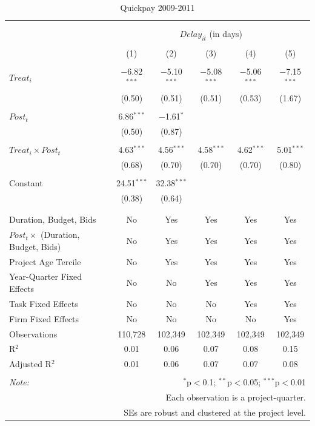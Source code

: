\documentclass[
]{article}
\begin{document}
\begin{table}[H] \centering 
  \caption{Quickpay 2009-2011} 
  \label{} 
\small 
\begin{tabular}{@{\extracolsep{-2pt}}lccccc} 
\\[-1.8ex]\hline 
\hline \\[-1.8ex] 
\\[-1.8ex] & \multicolumn{5}{c}{$Delay_{it}$ (in days)} \\ 
\\[-1.8ex] & (1) & (2) & (3) & (4) & (5)\\ 
\hline \\[-1.8ex] 
 $Treat_i$ & $-$6.82$^{***}$ & $-$5.10$^{***}$ & $-$5.08$^{***}$ & $-$5.06$^{***}$ & $-$7.15$^{***}$ \\ 
  & (0.50) & (0.51) & (0.51) & (0.53) & (1.67) \\ 
  & & & & & \\ 
 $Post_t$ & 6.86$^{***}$ & $-$1.61$^{*}$ &  &  &  \\ 
  & (0.50) & (0.87) &  &  &  \\ 
  & & & & & \\ 
 $Treat_i \times Post_t$ & 4.63$^{***}$ & 4.56$^{***}$ & 4.58$^{***}$ & 4.62$^{***}$ & 5.01$^{***}$ \\ 
  & (0.68) & (0.70) & (0.70) & (0.70) & (0.80) \\ 
  & & & & & \\ 
 Constant & 24.51$^{***}$ & 32.38$^{***}$ &  &  &  \\ 
  & (0.38) & (0.64) &  &  &  \\ 
  & & & & & \\ 
\hline \\[-1.8ex] 
Duration, Budget, Bids & No & Yes & Yes & Yes & Yes \\ 
$Post_t \times$  (Duration, Budget, Bids) & No & Yes & Yes & Yes & Yes \\ 
Project Age Tercile & No & Yes & Yes & Yes & Yes \\ 
Year-Quarter Fixed Effects & No & No & Yes & Yes & Yes \\ 
Task Fixed Effects & No & No & No & Yes & Yes \\ 
Firm Fixed Effects & No & No & No & No & Yes \\ 
Observations & 110,728 & 102,349 & 102,349 & 102,349 & 102,349 \\ 
R$^{2}$ & 0.01 & 0.06 & 0.07 & 0.08 & 0.15 \\ 
Adjusted R$^{2}$ & 0.01 & 0.06 & 0.07 & 0.07 & 0.08 \\ 
\hline 
\hline \\[-1.8ex] 
\textit{Note:}  & \multicolumn{5}{r}{$^{*}$p$<$0.1; $^{**}$p$<$0.05; $^{***}$p$<$0.01} \\ 
 & \multicolumn{5}{r}{Each observation is a project-quarter.} \\ 
 & \multicolumn{5}{r}{SEs are robust and clustered at the project level.} \\ 
\end{tabular} 
\end{table}
\end{document}
